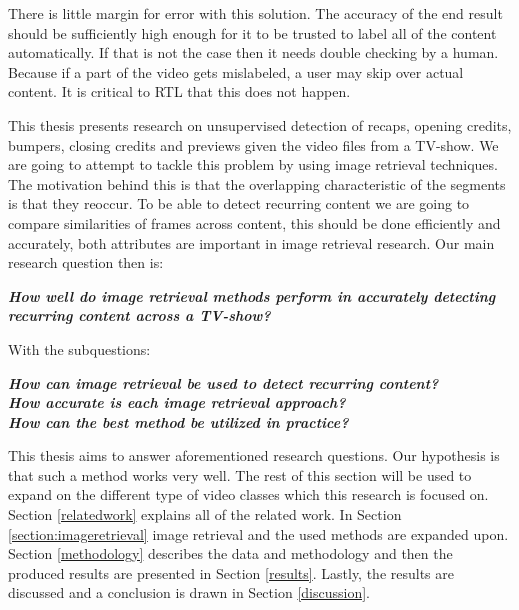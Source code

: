 \documentclass{article}
\begin{document}
There is little margin for error with this solution. The accuracy of the end result should be sufficiently high enough for it to be trusted to label all of the content automatically. If that is not the case then it needs double checking by a human. Because if a part of the video gets mislabeled, a user may skip over actual content. It is critical to RTL that this does not happen.

This thesis presents research on unsupervised detection of recaps, opening credits, bumpers, closing credits and previews given the video files from a TV-show. We are going to attempt to tackle this problem by using image retrieval techniques. The motivation behind this is that the overlapping characteristic of the segments is that they reoccur. To be able to detect recurring content we are going to compare similarities of frames across content, this should be done efficiently and accurately, both attributes are important in image retrieval research. Our main research question then is:
\newline
\begin{adjustwidth}{0.3in}{0.3in}
\textit{\textbf{How well do image retrieval methods perform in accurately detecting recurring content across a TV-show?\newline}}
\end{adjustwidth}
With the subquestions: \\
\begin{adjustwidth}{0.3in}{0.3in}
	\textit{\textbf{How can image retrieval be used to detect recurring content?\newline}}\\
	\textit{\textbf{How accurate is each image retrieval approach?\newline}}\\
	\textit{\textbf{How can the best method be utilized in practice?\newline}}
\end{adjustwidth}
This thesis aims to answer aforementioned research questions. Our hypothesis is that such a method works very well. The rest of this section will be used to expand on the different type of video classes which this research is focused on. Section \ref{relatedwork} explains all of the related work. In Section \ref{section:imageretrieval} image retrieval and the used methods are expanded upon. Section \ref{methodology} describes the data and methodology and then the produced results are presented in Section \ref{results}. Lastly, the results are discussed and a conclusion is drawn in Section \ref{discussion}.
\end{document}
